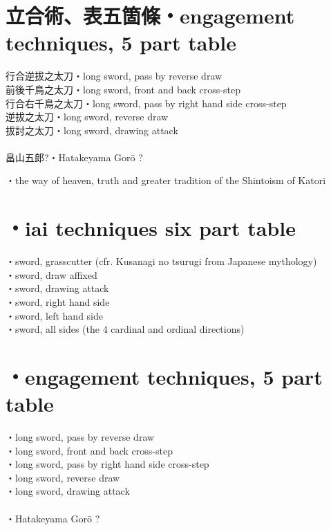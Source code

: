 \documentclass[dvipdfmx, a4paper, 12pt]{utarticle}
\begin{document}
\begin{CJK*}{UTF8}{min}
\begin{landscape}
\section{立合術、表五箇條・engagement techniques, 5 part table}
\noindent 行合逆拔之太刀・long sword, pass by reverse draw\\
前後千鳥之太刀・long sword, front and back cross-step\\
行合右千鳥之太刀・long sword, pass by right hand side cross-step\\
逆拔之太刀・long sword, reverse draw\\
拔討之太刀・long sword, drawing attack\\
\\
畠山五郎?・Hatakeyama Gor\={o} ?


\setcounter{section}{0}
\newpage
\pagestyle{empty}
・the way of heaven, truth and greater tradition of the Shintoism of Katori\\
\section{・iai techniques six part table}
\noindent {}・sword, grasscutter (cfr. Kusanagi no tsurugi from Japanese mythology)\\
・sword, draw affixed\\
・sword, drawing attack\\
・sword, right hand side\\
・sword, left hand side\\
・sword, all sides (the 4 cardinal and ordinal directions)\\
\section{・engagement techniques, 5 part table}
\noindent {}・long sword, pass by reverse draw\\
・long sword, front and back cross-step\\
・long sword, pass by right hand side cross-step\\
・long sword, reverse draw\\
・long sword, drawing attack\\
\\
・Hatakeyama Gor\={o} ?\\


\end{landscape}
\end{CJK*}
\end{document}
